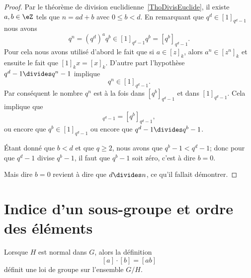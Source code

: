 \begin{proof}
    Par le théorème de division euclidienne~\ref{ThoDivisEuclide}, il existe \( a,b\in \eZ\) tels que \( n=ad+b\) avec \( 0\leq b<d\). En remarquant que \( q^d\in[1]_{q^d-1}\) nous avons
    \begin{equation}
        q^n=(q^d)^aq^b\in[1]_{q^d-1}q^b=[q^b]_{q^d-1}.
    \end{equation}
    Pour cela nous avons utilisé d'abord le fait que si \( a\in [z]_k\), alors \( a^n\in[z^n]_k\) et ensuite le fait que \( [1]_kx=[x]_k\). D'autre part l'hypothèse \( q^d-1\divides q^n-1\) implique
    \begin{equation}
        q^n\in[1]_{q^d-1}.
    \end{equation}
    Par conséquent le nombre \( q^n\) est à la fois dans \( [q^b]_{q^d-1}\) et dans \( [1]_{q^d-1}\). Cela implique que
    \begin{equation}
        [1]_{q^d-1}=[q^b]_{q^d-1},
    \end{equation}
    ou encore que \( q^b\in[1]_{q^d-1}\) ou encore que \( q^d-1\divides q^b-1\).

    Étant donné que \( b<d\) et que \( q\geq 2\), nous avons que \( q^b-1<q^d-1\); donc pour que \( q^d-1\) divise \( q^b-1\), il faut que \( q^b-1\) soit zéro, c'est à dire \( b=0\).

    Mais dire \( b=0\) revient à dire que \( d\divides n\), ce qu'il fallait démontrer.
\end{proof}

\section{Indice d'un sous-groupe et ordre des éléments}

\begin{lemma}       \label{LEMooFNVRooRCkjLc}
    Lorsque \( H\) est normal dans \( G\), alors la définition
    \begin{equation}        \label{EQooEUESooSeUWHK}
        [a]\cdot[b]=[ab]
    \end{equation}
    définit une loi de groupe sur l'ensemble \( G/H\).
\end{lemma}

